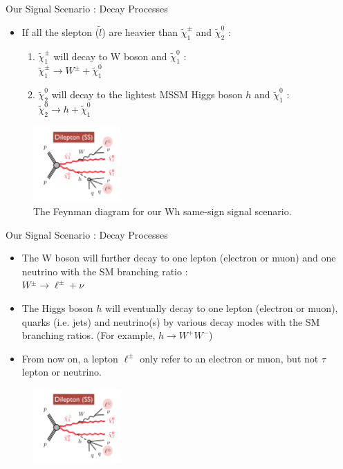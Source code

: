 \documentclass[mathserif,serif]{beamer}
\begin{document}
\begin{frame}{Our Signal Scenario : Decay Processes}
\begin{itemize}
\item If all the slepton ($\tilde{l}$) are heavier than $\tilde{\chi}_1^\pm$ and $\tilde{\chi}_2^0$ :
\begin{enumerate}
\item $\tilde{\chi}_1^\pm$ will decay to W boson and $\tilde{\chi}_1^0$ : \\
$\tilde{\chi}_1^\pm \rightarrow W^{\pm} + \tilde{\chi}_1^0$
\item $\tilde{\chi}_2^0$ will decay to the lightest MSSM Higgs boson $h$ and $\tilde{\chi}_1^0$ : \\
$\tilde{\chi}_2^0 \rightarrow h + \tilde{\chi}_1^0$
\end{enumerate}
\end{itemize}
\begin{figure}
\centering
\includegraphics[width=0.3\textwidth]{data/photo/theory/signal_feynman.png}
\caption{The Feynman diagram for our Wh same-sign signal scenario.}
\end{figure}
\end{frame}

\begin{frame}{Our Signal Scenario : Decay Processes}
\begin{itemize}
\item The W boson will further decay to one lepton (electron or muon) and one neutrino with the SM branching ratio : \\
$W{^\pm} \rightarrow \ell^{\pm} + \nu$
\item The Higgs boson $h$ will eventually decay to one lepton (electron or muon), quarks (i.e. jets) and neutrino(s) by various decay modes with the SM branching ratios. (For example, $h \rightarrow W^{+} W^{-} $)
\item From now on, a lepton $\ell^{\pm}$ only refer to an electron or muon, but not $\tau$ lepton or neutrino.
\end{itemize}
\begin{figure}
\centering
\includegraphics[width=0.3\textwidth]{data/photo/theory/signal_feynman.png}
\end{figure}
\end{frame}
\end{document}

